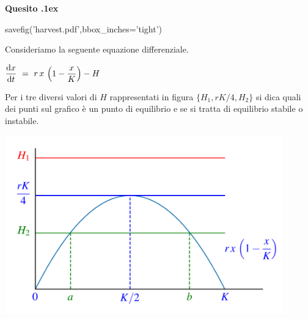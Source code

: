 \documentclass[11pt,twoside,a4paper]{article}
\newcounter{quesito}
\newenvironment{question}{\bigskip\addtocounter{quesito}{1}\bigskip\bigskip\par\textbf{Quesito \thequesito.\kern1ex}}{\vspace{\parskip}}
\begin{document}
\begin{question}
\begin{pycode}
savefig('harvest.pdf',bbox_inches='tight')
\end{pycode}

Consideriamo la seguente equazione differenziale. 

\hfil$\displaystyle\frac{{\rm d}x}{{\rm d}t}\ =\ r\,x\,\left(1-\frac{x}{K}\right) - H$

Per i tre diversi valori di $H$ rappresentati in figura $\{H_1, rK/4, H_2\}$ si dica quali dei punti sul grafico è un punto di equilibrio e se si tratta di equilibrio stabile o instabile.


\hfil\includegraphics[width=0.9\textwidth]{harvest.pdf}
\end{question}
\end{document}

